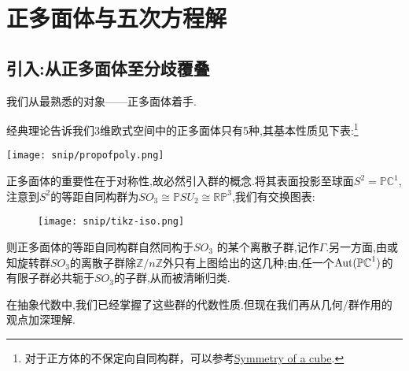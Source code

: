 
\chapter{正多面体与五次方程解}




\section{引入:从正多面体至分歧覆叠}
我们从最熟悉的对象——正多面体着手.

经典理论告诉我们3维欧式空间中的正多面体只有5种,其基本性质见下表:\footnote{对于正方体的不保定向自同构群，可以参考\href{http://jwilson.coe.uga.edu/EMAT6680Fa06/Sexton/NCTM\%20Three\%20Dimensional\%20Geometry/Symmetry\%20of\%20a\%20Cube.html}{Symmetry of a cube}.}

\begin{table}[ht]
	\texttt{[image: snip/propofpoly.png]}
\end{table}

	正多面体的重要性在于对称性,故必然引入群的概念.将其表面投影至球面$S^2=\mathbb{P}\mathbb{C}^1$,注意到$S^2$的等距自同构群为$SO_3\cong \mathbb{P}SU_2 \cong\mathbb{R}\mathbb{P}^3$,我们有交换图表:
\begin{figure}[ht]
	\centering
	\texttt{[image: snip/tikz-iso.png]}
\end{figure}
		
		
		则正多面体的等距自同构群自然同构于$SO_3$ 的某个离散子群,记作$\Gamma$.另一方面,由\cite[5.9.1]{artin2011algebra}或\cite[2.6]{shurman1997geometry}知旋转群$SO_3$的离散子群除$\mathbb{Z}/n\mathbb{Z}$外只有上图给出的这几种;由\cite{shurman1997geometry},任一个$\operatorname{Aut} (\mathbb{PC}^1)$的有限子群必共轭于$SO_3$的子群,从而被清晰归类.
		

		在抽象代数中,我们已经掌握了这些群的代数性质.但现在我们再从几何/群作用的观点加深理解.
		
